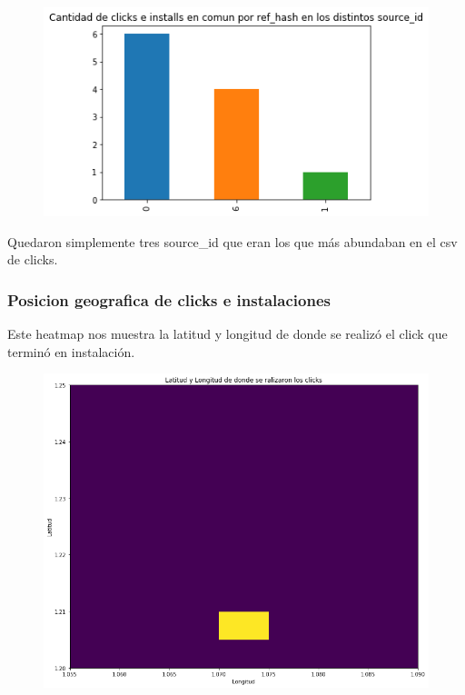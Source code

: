 \documentclass[a4paper, 12pt]{article}
\newcommand\tab[1][1cm]{\hspace*{#1}}
\begin{document}
{	\FloatBarrier
		\begin{figure}[h]
			\centering
			\includegraphics[width=\textwidth]{images/clicks-installs/source_id_bars.png}
			\caption{}
		\end{figure}
	\FloatBarrier
	
	\tab Quedaron simplemente tres source\_id que eran los que más abundaban en el csv de clicks.
	
	\subsubsection{Posicion geografica de clicks e instalaciones}
	\tab Este heatmap nos muestra la latitud y longitud de donde se realizó el click que terminó en instalación.
	
	\FloatBarrier
		\begin{figure}[h]
			\centering
			\includegraphics[width=\textwidth]{images/clicks-installs/lat_long_heat.png}
			\caption{}
		\end{figure}
	\FloatBarrier	
	
}
\end{document}
